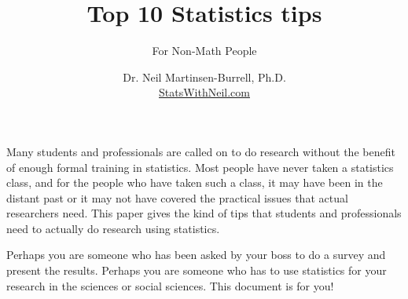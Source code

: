 \documentclass[12pt,
letterpaper,
twoside=false,
smallheadings,
]{scrreprt}
\title{Top 10 Statistics tips}
\subtitle{For Non-Math People}
\author{Dr. Neil Martinsen-Burrell, Ph.D.
  \\\href{http://statswithneil.com}{StatsWithNeil.com}}
\date{}
\begin{document}
\maketitle

Many students and professionals are called on to do research without the
benefit of enough formal training in statistics.  Most people have never taken
a statistics class, and for the people who have taken such a class, it may
have been in the distant past or it may not have covered the practical issues
that actual researchers need.  This paper gives the kind of tips that students
and professionals need to actually do research using statistics.

Perhaps you are someone who has been asked by your boss to do a survey and
present the results.  Perhaps you are someone who has to use statistics for
your research in the sciences or social sciences.  This document is for you!
\end{document}
